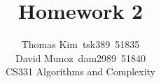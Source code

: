 \documentclass[12pt]{article}
\begin{document}
\title{Homework 2}
\author{Thomas Kim~tsk389~51835\\David Munoz~dam2989~51840\\
CS331 Algorithms and Complexity}

\renewcommand{\arraystretch}{2.0}

\date{} %


\maketitle

\onecolumn







\end{document}

